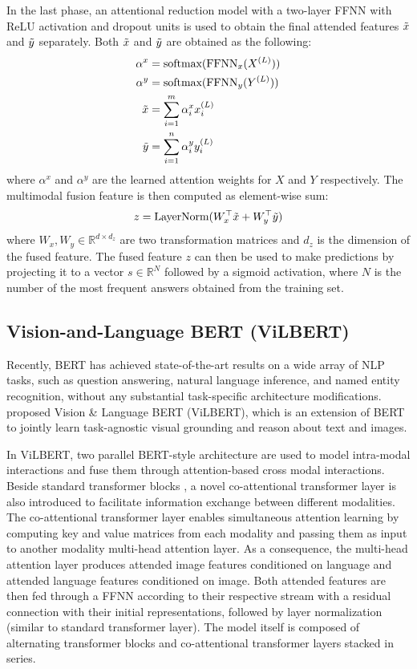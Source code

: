 \documentclass{article}
\begin{document}
In the last phase, an attentional reduction model with a two-layer FFNN with ReLU activation and dropout units is used to obtain the final attended features $\Tilde{x}$ and $\Tilde{y}$ separately. Both $\Tilde{x}$ and $\Tilde{y}$ are obtained as the following:
\begin{align}
    \alpha^{x} &= \text{softmax}(\text{FFNN}_{x}(X^{(L)})) \\
    \alpha^{y} &= \text{softmax}(\text{FFNN}_{y}(Y^{(L)})) \\
    \Tilde{x} &= \sum_{i=1}^{m}\alpha^{x}_{i}x^{(L)}_{i}  \label{eq_mcan_att} \\ 
     \Tilde{y} &= \sum_{i=1}^{n}\alpha^{y}_{i}y^{(L)}_{i}
\end{align}
where $\alpha^{x}$ and $\alpha^{y}$ are the learned attention weights for $X$ and $Y$ respectively. The multimodal fusion feature is then computed as element-wise sum:
\begin{align}
    z = \text{LayerNorm}(W^{\top}_{x}\Tilde{x} + W^{\top}_{y}\Tilde{y})
\end{align}
where $W_{x}, W_{y} \in \mathbb{R}^{d \times d_{z}}$ are two transformation matrices and $d_{z}$ is the dimension of the fused feature. The fused feature $z$ can then be used to make predictions by projecting it to a vector $s \in \mathbb{R}^{N}$ followed by a sigmoid activation, where $N$ is the number of the most frequent answers obtained from the training set.

\subsection{Vision-and-Language BERT (ViLBERT)} \label{subsection:vilbert}
Recently, BERT \citep{devlin-etal-2019-bert} has achieved state-of-the-art results on a wide array of NLP tasks, such as question answering, natural language inference, and named entity recognition, without any substantial task-specific architecture modifications. \citet{lu2019vilbert} proposed Vision \& Language BERT (ViLBERT), which is an extension of BERT to jointly learn task-agnostic visual grounding and reason about text and images. 

In ViLBERT, two parallel BERT-style architecture are used to model intra-modal interactions and fuse them through attention-based cross modal interactions. Beside standard transformer blocks \citep{transformers}, a novel co-attentional transformer layer is also introduced to facilitate information exchange between different modalities. The co-attentional transformer layer enables simultaneous attention learning by computing key and value matrices from each modality and passing them as input to another modality multi-head attention layer. As a consequence, the multi-head attention layer produces attended image features conditioned on language and attended language features conditioned on image. Both attended features are then fed through a FFNN according to their respective stream with a residual connection with their initial representations, followed by layer normalization (similar to standard transformer layer). The model itself is composed of alternating transformer blocks and co-attentional transformer layers stacked in series. 
\end{document}
